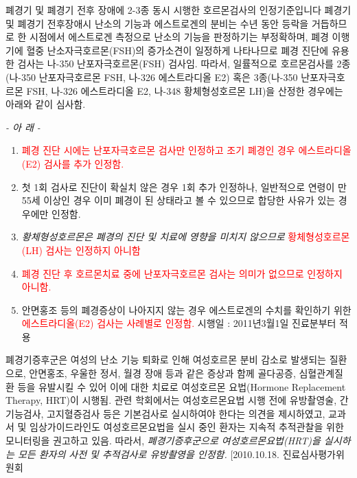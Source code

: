 {
폐경기 및 폐경기 전후 장애에 2-3종 동시 시행한 호르몬검사의 인정기준입니다
폐경기 및 폐경기 전\bullet 후장애시 난소의 기능과 에스트로겐의 분비는 수년 동안 등락을 거듭하므로 한 시점에서 에스트로겐 측정으로 난소의 기능을 판정하기는 부정확하며, 폐경 이행기에 혈중 난소자극호르몬(FSH)의 증가소견이 일정하게 나타나므로 폐경 진단에 유용한 검사는 나-350 난포자극호르몬(FSH) 검사임. 따라서, 일률적으로 호르몬검사를 2종(나-350 난포자극호르몬 FSH, 나-326 에스트라디올 E2) 혹은 3종(나-350 난포자극호르몬 FSH, 나-326 에스트라디올 E2, 나-348 황체형성호르몬 LH)을 산정한 경우에는 아래와 같이 심사함.
\begin{center}\emph{- 아 래 -}\end{center}
\begin{enumerate}[가.]\tightlist
\item \textcolor{red}{폐경 진단 시에는 난포자극호르몬 검사만 인정하고 조기 폐경인 경우 에스트라디올(E2) 검사를 추가 인정함.}
\item 첫 1회 검사로 진단이 확실치 않은 경우 1회 추가 인정하나, 일반적으로 연령이 만55세 이상인 경우 이미 폐경이 된 상태라고 볼 수 있으므로 합당한 사유가 있는 경우에만 인정함.
\item \emph{황체형성호르몬은 폐경의 진단 및 치료에 영향을 미치지 않으므로} \textcolor{red}{황체형성호르몬(LH) 검사는 인정하지 아니함}
\item \textcolor{red}{폐경 진단 후 호르몬치료 중에 난포자극호르몬 검사는 의미가 없으므로 인정하지 아니함.}
\item 안면홍조 등의 폐경증상이 나아지지 않는 경우 에스트로겐의 수치를 확인하기 위한 \textcolor{red}{에스트라디올(E2) 검사는 사례별로 인정함.} 시행일 : 2011년3월1일 진료분부터 적용
\end{enumerate}
 
폐경기증후군은 여성의 난소 기능 퇴화로 인해 여성호르몬 분비 감소로 발생되는 질환으로, 안면홍조, 우울한 정서, 월경 장애 등과 같은 증상과 함께 골다공증, 심혈관계질환 등을 유발시킬 수 있어 이에 대한 치료로 여성호르몬 요법(Hormone Replacement Therapy, HRT)이 시행됨. 관련 학회에서는 여성호르몬요법 시행 전에 유방촬영술, 간기능검사, 고지혈증검사 등은 기본검사로 실시하여야 한다는 의견을 제시하였고, 교과서 및 임상가이드라인도 여성호르몬요법을 실시 중인 환자는 지속적 추적관찰을 위한 모니터링을 권고하고 있음. 따라서, \emph{폐경기증후군으로 여성호르몬요법(HRT)을 실시하는 모든 환자의 사전 및 추적검사로 유방촬영을 인정함.} [2010.10.18. 진료심사평가위원회
}
